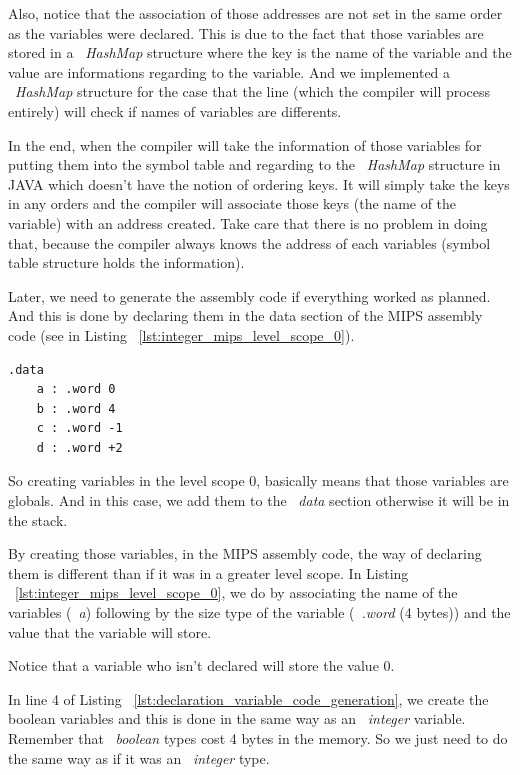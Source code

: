 \documentclass[
  oneside,
  11pt, a4paper,
  footinclude=true,
  headinclude=true,
  cleardoublepage=empty
]{scrbook}
\begin{document}
Also, notice that the association of those addresses are not set in the same order as the variables were declared. This is due to the fact that those variables are stored in a ~\textit{HashMap} structure where the key is the name of the variable and the value are informations regarding to the variable. And we implemented a ~\textit{HashMap} structure for the case that the line (which the compiler will process entirely) will check if names of variables are differents.

In the end, when the compiler will take the information of those variables for putting them into the symbol table and regarding to the ~\textit{HashMap} structure in JAVA which doesn't have the notion of ordering keys. It will simply take the keys in any orders and the compiler will associate those keys (the name of the variable) with an address created. 
Take care that there is no problem in doing that, because the compiler always knows the address of each variables (symbol table structure holds the information).

Later, we need to generate the assembly code if everything worked as planned. And this is done by declaring them in the data section of the MIPS assembly code (see in Listing ~\ref{lst:integer_mips_level_scope_0}).

\begin{lstlisting}[caption={Code generation of integer variables in MIPS assembly code},label={lst:integer_mips_level_scope_0}]
  .data
	a : .word 0		
	b : .word 4	
	c : .word -1		
	d : .word +2		
\end{lstlisting}

So creating variables in the level scope 0, basically means that those variables are globals.
And in this case, we add them to the ~\textit{data} section otherwise it will be in the stack.

By creating those variables, in the MIPS assembly code, the way of declaring them is different than if it was in a greater level scope.
In Listing ~\ref{lst:integer_mips_level_scope_0}, we do by associating the name of the variables (~\textit{a}) following by the size type of the variable (~\textit{.word} (4 bytes)) and  the value that the variable will store.

Notice that a variable who isn't declared will store the value 0.

In line 4 of Listing ~\ref{lst:declaration_variable_code_generation}, we create the boolean variables and this is done in the same way as an ~\textit{integer} variable.
Remember that ~\textit{boolean} types cost 4 bytes in the memory. So we just need to do the same way as if it was an ~\textit{integer} type.
\end{document}
